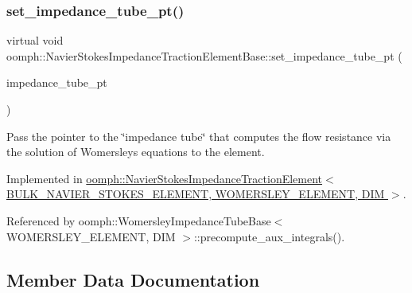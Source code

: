 \subsubsection{\texorpdfstring{set\+\_\+impedance\+\_\+tube\+\_\+pt()}{set\_impedance\_tube\_pt()}}
{\footnotesize\ttfamily virtual void oomph\+::\+Navier\+Stokes\+Impedance\+Traction\+Element\+Base\+::set\+\_\+impedance\+\_\+tube\+\_\+pt (\begin{DoxyParamCaption}\item[{\hyperlink{classoomph_1_1TemplateFreeWomersleyImpedanceTubeBase}{Template\+Free\+Womersley\+Impedance\+Tube\+Base} $\ast$}]{impedance\+\_\+tube\+\_\+pt }\end{DoxyParamCaption})\hspace{0.3cm}{\ttfamily [pure virtual]}}



Pass the pointer to the \char`\"{}impedance tube\char`\"{} that computes the flow resistance via the solution of Womersley\textquotesingle{}s equations to the element. 



Implemented in \hyperlink{classoomph_1_1NavierStokesImpedanceTractionElement_aab0f649a0569d9caa428b8a932cc1c40}{oomph\+::\+Navier\+Stokes\+Impedance\+Traction\+Element$<$ B\+U\+L\+K\+\_\+\+N\+A\+V\+I\+E\+R\+\_\+\+S\+T\+O\+K\+E\+S\+\_\+\+E\+L\+E\+M\+E\+N\+T, W\+O\+M\+E\+R\+S\+L\+E\+Y\+\_\+\+E\+L\+E\+M\+E\+N\+T, D\+I\+M $>$}.



Referenced by oomph\+::\+Womersley\+Impedance\+Tube\+Base$<$ W\+O\+M\+E\+R\+S\+L\+E\+Y\+\_\+\+E\+L\+E\+M\+E\+N\+T, D\+I\+M $>$\+::precompute\+\_\+aux\+\_\+integrals().



\subsection{Member Data Documentation}
\mbox{\label{classoomph_1_1NavierStokesImpedanceTractionElementBase_a460dbb1435dcd04e506b90d029513fc2}} 
